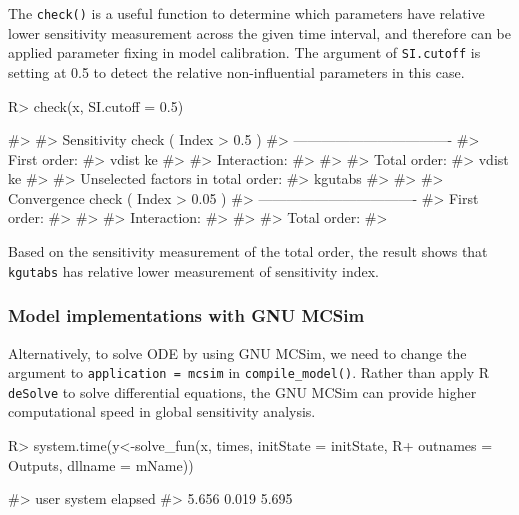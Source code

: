\documentclass[article]{jss}
\begin{document}
The \texttt{check()} is a useful function to determine which parameters
have relative lower sensitivity measurement across the given time
interval, and therefore can be applied parameter fixing in model
calibration. The argument of \texttt{SI.cutoff} is setting at 0.5 to
detect the relative non-influential parameters in this case.

\begin{CodeChunk}

\begin{CodeInput}
R> check(x, SI.cutoff = 0.5)
\end{CodeInput}

\begin{CodeOutput}
#> 
#> Sensitivity check ( Index > 0.5 )
#> ----------------------------------
#> First order:
#>  vdist ke 
#> 
#> Interaction:
#>   
#> 
#> Total order:
#>  vdist ke 
#> 
#> Unselected factors in total order:
#>  kgutabs 
#> 
#> 
#> Convergence check ( Index > 0.05 )
#> ----------------------------------
#> First order:
#>   
#> 
#> Interaction:
#>   
#> 
#> Total order:
#> 
\end{CodeOutput}
\end{CodeChunk}

Based on the sensitivity measurement of the total order, the result
shows that \texttt{kgutabs} has relative lower measurement of
sensitivity index.

\hypertarget{model-implementations-with-gnu-mcsim}{%
\subsubsection{Model implementations with GNU
MCSim}\label{model-implementations-with-gnu-mcsim}}

Alternatively, to solve ODE by using GNU MCSim, we need to change the
argument to \texttt{application\ =\ mcsim} in \texttt{compile\_model()}.
Rather than apply R \texttt{deSolve} to solve differential equations,
the GNU MCSim can provide higher computational speed in global
sensitivity analysis.

\begin{CodeChunk}

\begin{CodeInput}
R> system.time(y<-solve_fun(x, times, initState = initState, 
R+                          outnames = Outputs, dllname = mName))
\end{CodeInput}

\begin{CodeOutput}
#>    user  system elapsed 
#>   5.656   0.019   5.695
\end{CodeOutput}
\end{CodeChunk}
\end{document}
